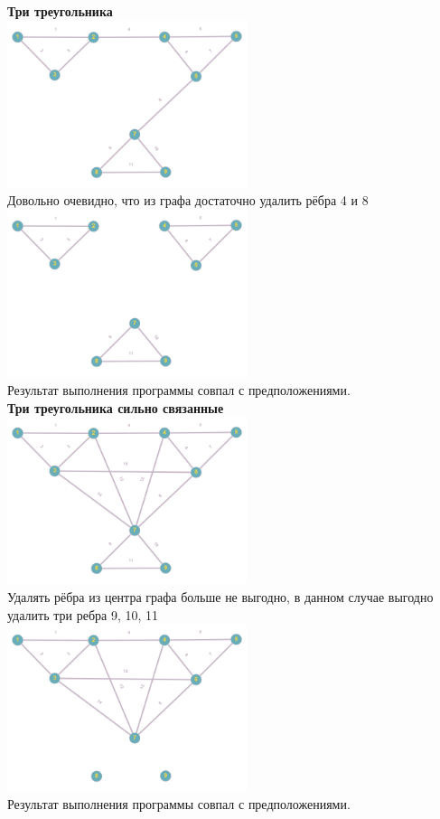 \documentclass[a4paper,14pt]{extarticle}
\begin{document}
\begin{enumerate}[1.]
        \textbf{Три треугольника}\\
        \includegraphics[width=70mm]{testThreeTrianglesBefore}\\
        Довольно очевидно, что из графа достаточно удалить рёбра 4 и 8\\
        \includegraphics[width=70mm]{testThreeTrianglesAfter}\\
        Результат выполнения программы совпал с предположениями.\\

        \textbf{Три треугольника сильно связанные}\\
        \includegraphics[width=70mm]{testThreeTrianglesStronglyLinkedBefore}\\
        Удалять рёбра из центра графа больше не выгодно, в данном случае выгодно удалить три ребра 9, 10, 11\\
        \includegraphics[width=70mm]{testThreeTrianglesStronglyLinkedAfter}\\
        Результат выполнения программы совпал с предположениями.\\


\end{enumerate}
\end{document}
